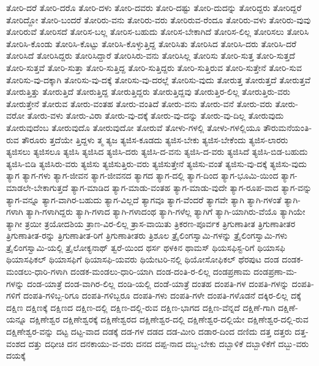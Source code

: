 {ತೋರಿ-ದರೆ
ತೋರಿ-ದರೊ
ತೋರಿ-ದಳು
ತೋರಿ-ದವರು
ತೋರಿ-ದಷ್ಟು
ತೋರಿ-ದುದನ್ನು
ತೋರಿದ್ದರು
ತೋರಿದ್ದರೆ
ತೋರಿದ್ದೋ
ತೋರಿ-ಬಂದರೆ
ತೋರಿರು-ವನು
ತೋರಿರು-ವರು
ತೋರಿರುವ-ರೆಂದೂ
ತೋರಿರು-ವಳು
ತೋರಿರು-ವುವು
ತೋರಿರುವೆ
ತೋರಿಸದೆ
ತೋರಿಸ-ಬಲ್ಲ
ತೋರಿಸ-ಬಹುದು
ತೋರಿಸ-ಬೇಕಾಗಿದೆ
ತೋರಿಸ-ಲಿಲ್ಲ
ತೋರಿಸಲು
ತೋರಿಸಿ
ತೋರಿಸಿ-ಕೊಂಡು
ತೋರಿಸಿ-ಕೊಟ್ಟು
ತೋರಿಸಿ-ಕೊಳ್ಳುತ್ತಿದ್ದ
ತೋರಿಸಿತು
ತೋರಿಸಿದ
ತೋರಿಸಿ-ದರು
ತೋರಿಸಿ-ದರೆ
ತೋರಿಸಿದೆ
ತೋರಿಸಿದ್ದರು
ತೋರಿಸಿದ್ದಾರೆ
ತೋರಿಸಿರು-ವನು
ತೋರಿಸಿಲ್ಲ
ತೋರಿಸು
ತೋರಿ-ಸುತ್ತ
ತೋರಿ-ಸುತ್ತದೆ
ತೋರಿ-ಸುತ್ತವೆ
ತೋರಿ-ಸುತ್ತಾ
ತೋರಿ-ಸುತ್ತಿದ್ದ
ತೋರಿ-ಸುತ್ತಿದ್ದರು
ತೋರಿ-ಸುತ್ತಿರುವ
ತೋರಿ-ಸುತ್ತೇನೆ
ತೋರಿ-ಸುವ
ತೋರಿಸು-ವು-ದಕ್ಕಾಗಿ
ತೋರಿಸು-ವು-ದಕ್ಕೆ
ತೋರಿಸು-ವು-ದರಲ್ಲೆ
ತೋರಿಸು-ವುದು
ತೋರುತ್ತ
ತೋರುತ್ತದೆ
ತೋರುತ್ತವೆ
ತೋರುತ್ತಿತ್ತು
ತೋರುತ್ತಿದೆ
ತೋರುತ್ತಿದ್ದ
ತೋರುತ್ತಿದ್ದರು
ತೋರುತ್ತಿದ್ದವು
ತೋರುತ್ತಿರ-ಲಿಲ್ಲ
ತೋರುತ್ತಿರು-ವರು
ತೋರುತ್ತೇನೆ
ತೋರುವ
ತೋರು-ವಂತಹ
ತೋರು-ವಂತಿದೆ
ತೋರು-ವನು
ತೋರು-ವನೆ
ತೋರು-ವರು
ತೋರು-ವರೋ
ತೋರು-ವಳು
ತೋರು-ವಿರಾ
ತೋರು-ವು-ದಕ್ಕೆ
ತೋರು-ವು-ದನ್ನು
ತೋರು-ವು-ದಿಲ್ಲ
ತೋರುವುದು
ತೋರುವುದೆಂಬ
ತೋರುವುದೊ
ತೋರುವುದೋ
ತೋರುವೆ
ತೋಳು-ಗಳಲ್ಲಿ
ತೋಳು-ಗಳಲ್ಲಿಯೂ
ತೌರುಮನೆಯಂತಿ-ರುವ
ತೌರೂರು
ತ್ತದೆಯೇ
ತ್ತಿದ್ದಳು
ತ್ಮ
ತ್ಯಜ
ತ್ಯಜಿಸ-ಕೂಡದು
ತ್ಯಜಿಸ-ಬೇಕು
ತ್ಯಜಿಸ-ಬೇಕೆಂದು
ತ್ಯಜಿಸ-ಲಾರರು
ತ್ಯಜಿಸಲು
ತ್ಯಜಿಸಲೂ
ತ್ಯಜಿಸಿ
ತ್ಯಜಿಸಿದ
ತ್ಯಜಿಸಿ-ದರು
ತ್ಯಜಿಸಿ-ದ-ವನು
ತ್ಯಜಿಸಿ-ದ-ವರು
ತ್ಯಜಿಸಿದೆ
ತ್ಯಜಿಸಿ-ಬಿಡ-ಬಹುದು
ತ್ಯಜಿಸಿ-ಬಿಡಿ
ತ್ಯಜಿಸಿರು-ವರು
ತ್ಯಜಿಸು
ತ್ಯಜಿಸುತ್ತಿರು-ವರು
ತ್ಯಜಿಸುತ್ತೇನೆ
ತ್ಯಜಿಸು-ವಂತೆ
ತ್ಯಜಿಸು-ವು-ದಕ್ಕೆ
ತ್ಯಜಿಸು-ವುದು
ತ್ಯಾಗ
ತ್ಯಾಗ-ಗಳು
ತ್ಯಾಗ-ಜೀವನ
ತ್ಯಾಗ-ಜೀವನದ
ತ್ಯಾಗದ
ತ್ಯಾಗ-ದಲ್ಲಿ
ತ್ಯಾಗ-ದಿಂದ
ತ್ಯಾಗ-ಭೂಮಿ-ಯಿಂದ
ತ್ಯಾಗ-ಮಾಡಲೇ-ಬೇಕಾಗುತ್ತದೆ
ತ್ಯಾಗ-ಮಾಡಿದ
ತ್ಯಾಗ-ಮಾಡು-ವಂತಹ
ತ್ಯಾಗ-ಮಾಡು-ವುದೇ
ತ್ಯಾಗ-ರೂಪ-ವಾದ
ತ್ಯಾಗ-ವನ್ನು
ತ್ಯಾಗ-ವನ್ನೂ
ತ್ಯಾಗ-ವಾಗಿರ-ಬಹುದು
ತ್ಯಾಗ-ವಿಲ್ಲದೆ
ತ್ಯಾಗವೂ
ತ್ಯಾಗ-ವೆಂದರೆ
ತ್ಯಾಗವೇ
ತ್ಯಾಗಿ
ತ್ಯಾಗಿ-ಗಳಂತೆ
ತ್ಯಾಗಿ-ಗಳಾಗಿ
ತ್ಯಾಗಿ-ಗಳಾಗಿದ್ದರು
ತ್ಯಾಗಿ-ಗಳಾದ
ತ್ಯಾಗಿ-ಗಳಾದಂಥ
ತ್ಯಾಗಿ-ಗಳೆಲ್ಲ
ತ್ಯಾಗಿಗೆ
ತ್ಯಾಗಿ-ಯಾಗಿರು-ವೆಯೊ
ತ್ಯಾಗಿಯೇ
ತ್ಯಾಗೀ
ತ್ರಯೀ
ತ್ರಯೋದಶಿಯ
ತ್ರಾಣ-ವಿರ-ಲಿಲ್ಲ
ತ್ರಾಸ-ವಾಯಿತು
ತ್ರಿಕರಣ-ಪೂರ್ವಕ
ತ್ರಿಗುಣಾತೀತ
ತ್ರಿಗುಣಾತೀತರ
ತ್ರಿಗುಣಾತೀತ-ರನ್ನು
ತ್ರಿಗುಣಾತೀತ-ರಿಗೆ
ತ್ರಿಗುಣಾತೀತರು
ತ್ರಿಶೂಲ
ತ್ರೈಲಿಂಗಸ್ವಾಮಿ-ಗಳನ್ನು
ತ್ರೈಲಿಂಗಸ್ವಾಮಿ-ಗಳು
ತ್ರೈಲಿಂಗಸ್ವಾಮಿ-ಯಲ್ಲಿ
ತ್ರೈಲೋಕ್ಯನಾಥ್
ತ್ವರೆ-ಯಿಂದ
ಥರ್ಸ
ಥಳಕಿನ
ಥಾಮಸ್
ಥಿಯಸಫಿಸ್ಟ-ರಿಗೆ
ಥಿಯಾಸಫಿ
ಥಿಯಾಸಫಿಕಲ್
ಥಿಯಾಸಫಿಗೆ
ಥಿಯಾಸಫಿ-ಯವರು
ಥಿಯೇಟರಿ-ನಲ್ಲಿ
ಥಿಯೋಸೋಫಿಕಲ್
ಥೆರಪುಟ
ದಂಡ
ದಂಡಕ-ಮಂಡಲು-ಧಾರಿ-ಗಳಾಗಿ
ದಂಡಕ-ಮಂಡಲು-ಧಾರಿ-ಯಾಗಿ
ದಂಡ-ದಂತಿ-ರ-ಲಿಲ್ಲ
ದಂಡಪ್ರಣಾಮ
ದಂಡಪ್ರಣಾ-ಮ-ಗಳನ್ನು
ದಂಡ-ಯಾತ್ರೆ
ದಂಡ-ವಾಗಿರ-ಲಿಲ್ಲ
ದಂಡಿ-ಯಲ್ಲಿ
ದಂಡೆ-ಯಾತ್ರೆ
ದಂತಹ
ದಂಪತಿ-ಗಳ
ದಂಪತಿ-ಗಳನ್ನು
ದಂಪತಿ-ಗಳಿಗೆ
ದಂಪತಿ-ಗಳಿಬ್ಬ-ರಿಗೂ
ದಂಪತಿ-ಗಳಿಬ್ಬರೂ
ದಂಪತಿ-ಗಳು
ದಂಪತಿ-ಗಳೇ
ದಂಪತಿ-ಗಳೊಡನೆ
ದಕ್ಕಿರ-ಲಿಲ್ಲ
ದಕ್ಕೆ
ದಕ್ಷಿಣ
ದಕ್ಷಿಣಕ್ಕೆ
ದಕ್ಷಿಣದ
ದಕ್ಷಿಣ-ದಲ್ಲಿ
ದಕ್ಷಿಣ-ದಲ್ಲಿ-ರುವ
ದಕ್ಷಿಣ-ಭಾಗದ
ದಕ್ಷಿಣ-ವೆನ್ನದೆ
ದಕ್ಷಿಣೆ-ಗಾಗಿ
ದಕ್ಷಿಣೆ-ಯನ್ನೂ
ದಕ್ಷಿಣೇಶ್ವರ
ದಕ್ಷಿಣೇಶ್ವರಕ್ಕೆ
ದಕ್ಷಿಣೇಶ್ವರದ
ದಕ್ಷಿಣೇಶ್ವರ-ದಲ್ಲಿ
ದಕ್ಷಿಣೇಶ್ವರ-ದಲ್ಲಿಯೇ
ದಕ್ಷಿಣೇಶ್ವರ-ದಲ್ಲಿ-ರುವ
ದಕ್ಷಿಣೇಶ್ವರ-ವನ್ನು
ದಟ್ಟ
ದಟ್ಟ-ವಾದ
ದಡಕ್ಕೆ
ದಡ-ಗಳ
ದಡದ
ದಡ-ಮೀರಿ
ದಡಾರ-ದಿಂದ
ದಣಿದು
ದತ್ತ
ದತ್ತರು
ದತ್ತ-ವಂಶದ
ದತ್ತು
ದಧೀಚಿ
ದನ
ದನಕಾಯು-ವ-ವರು
ದನದ
ದಪ್ಪ-ನಾದ
ದಬ್ಬ-ಬೇಕು
ದಬ್ಬಾಳಿಕೆ
ದಬ್ಬಾಳಿಕೆಗೆ
ದಬ್ಬು-ವರು
ದಯಕ್ಕೆ
}
